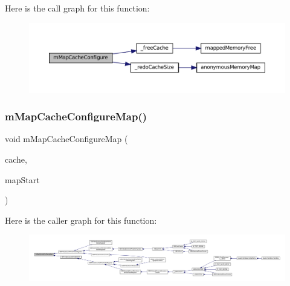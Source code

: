 Here is the call graph for this function\+:
\nopagebreak
\begin{figure}[H]
\begin{center}
\leavevmode
\includegraphics[width=350pt]{map-cache_8c_a5d5ff55807cf89a961eaae6c599191ea_cgraph}
\end{center}
\end{figure}
\mbox{\label{map-cache_8c_ac10e008271c7b3928897ab928d542cc5}} 
\subsubsection{\texorpdfstring{m\+Map\+Cache\+Configure\+Map()}{mMapCacheConfigureMap()}}
{\footnotesize\ttfamily void m\+Map\+Cache\+Configure\+Map (\begin{DoxyParamCaption}\item[{struct m\+Map\+Cache $\ast$}]{cache,  }\item[{uint32\+\_\+t}]{map\+Start }\end{DoxyParamCaption})}

Here is the caller graph for this function\+:
\nopagebreak
\begin{figure}[H]
\begin{center}
\leavevmode
\includegraphics[width=350pt]{map-cache_8c_ac10e008271c7b3928897ab928d542cc5_icgraph}
\end{center}
\end{figure}
\mbox{\label{map-cache_8c_a4da999fdbbac1c998ca0e5299d56db70}} 
